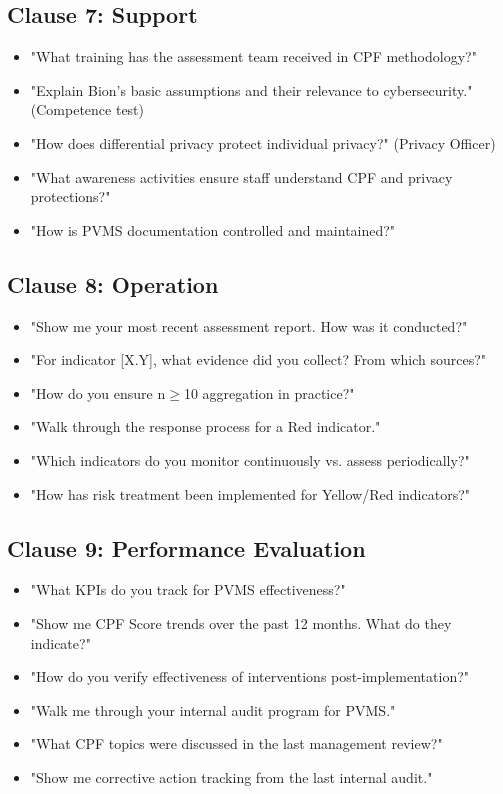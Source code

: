 \documentclass[11pt,a4paper]{article}
\begin{document}
\subsection{Clause 7: Support}

\begin{itemize}
\item "What training has the assessment team received in CPF methodology?"
\item "Explain Bion's basic assumptions and their relevance to cybersecurity." (Competence test)
\item "How does differential privacy protect individual privacy?" (Privacy Officer)
\item "What awareness activities ensure staff understand CPF and privacy protections?"
\item "How is PVMS documentation controlled and maintained?"
\end{itemize}

\subsection{Clause 8: Operation}

\begin{itemize}
\item "Show me your most recent assessment report. How was it conducted?"
\item "For indicator [X.Y], what evidence did you collect? From which sources?"
\item "How do you ensure n$\geq$10 aggregation in practice?"
\item "Walk through the response process for a Red indicator."
\item "Which indicators do you monitor continuously vs. assess periodically?"
\item "How has risk treatment been implemented for Yellow/Red indicators?"
\end{itemize}

\subsection{Clause 9: Performance Evaluation}

\begin{itemize}
\item "What KPIs do you track for PVMS effectiveness?"
\item "Show me CPF Score trends over the past 12 months. What do they indicate?"
\item "How do you verify effectiveness of interventions post-implementation?"
\item "Walk me through your internal audit program for PVMS."
\item "What CPF topics were discussed in the last management review?"
\item "Show me corrective action tracking from the last internal audit."
\end{itemize}
\end{document}
